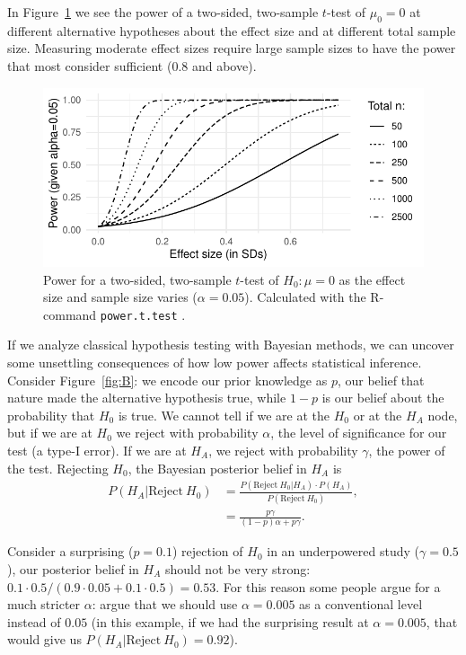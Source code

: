 \documentclass[10pt]{article}
\begin{document}
In Figure~\ref{fig:power} we see the power of a two-sided, two-sample $t$-test
of $\mu_0=0$ at different alternative hypotheses about the effect size and at
different total sample size. Measuring moderate effect sizes require large sample
sizes to have the power that most consider sufficient (0.8 and above). 

\begin{figure}[tb]
\includegraphics[width=\textwidth]{../graphs/powergraph}

\caption{Power for a two-sided, two-sample $t$-test of $H_0: \mu=0$ as the effect 
size and sample size varies ($\alpha=0.05$). Calculated with the R-command \texttt{power.t.test} \citep{R2023}.}\label{fig:power}
\end{figure}


If we analyze classical hypothesis testing with Bayesian methods, we can uncover
some unsettling consequences of how low power affects statistical inference.
Consider Figure~\ref{fig:B}: we encode our prior knowledge as $p$, our belief
that nature made the alternative hypothesis true, while $1-p$ is our belief
about the probability that $H_0$ is true. We cannot tell if we are at the
$H_0$ or at the $H_{\!A}$ node, but if we are at $H_0$ we reject with probability $\alpha$,
the level of significance for our test (a type-I error). If we are at $H_{\!A}$, we
reject with probability $\gamma$, the power of the test. Rejecting $H_0$, the
Bayesian posterior belief in $H_{\!A}$ is
\begin{align*}
   P(H_{\!A}|\mathrm{Reject}\ H_0) & = \frac{P(\mathrm{Reject}\ H_0|H_{\!A}) \cdot P(H_{\!A})}{P(\mathrm{Reject}\ H_0)}, \\
   &= \frac{p\gamma}{(1-p)\alpha + p\gamma}.  
\end{align*}

Consider a surprising ($p=0.1$) rejection of $H_0$  in an underpowered study ($\gamma=0.5$),
our posterior belief in $H_{\!A}$ should not be very strong: $0.1\cdot 0.5 /
(0.9\cdot 0.05 + 0.1\cdot 0.5) = 0.53$. For this reason some people argue for a
much stricter $\alpha$: \citet{Benjamin2017} argue that we should use
$\alpha=0.005$ as a conventional level instead of $0.05$ (in this example, if we had
the surprising result at $\alpha=0.005$, that would give us $P(H_{\!A}|\mathrm{Reject}\ H_0)=0.92$). 
\end{document}
